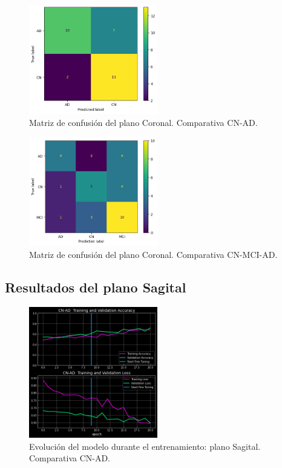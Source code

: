 \begin{figure}[H]
    \centering
    \includegraphics[width=0.5\textwidth]{./imgs/resultados/coronal/CN_AD_cm_CORONAL}
    \caption{Matriz de confusión del plano Coronal. Comparativa CN-AD. }
    \label{fig:mc-coronal-cn-ad}
\end{figure}

\begin{figure}[H]
    \centering
    \includegraphics[width=0.5\textwidth]{./imgs/resultados/coronal/CN_MCI_AD_cm_CORONAL}
    \caption{Matriz de confusión del plano Coronal. Comparativa CN-MCI-AD. }
    \label{fig:mc-coronal-cn-mci-ad}
\end{figure}

\subsection{Resultados del plano Sagital}\label{subsec:resultados-del-plano-sagital}

\begin{figure}[H]
    \centering
    \includegraphics[width=0.5\textwidth]{./imgs/resultados/sagittal/CN_AD_output_SAGITTAL}
    \caption{Evolución del modelo durante el entrenamiento: plano Sagital. Comparativa CN-AD. }
    \label{fig:sagital-cn-ad}
\end{figure}

